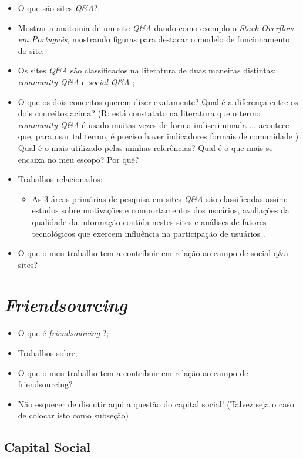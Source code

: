 

\begin{itemize}
  \item O que são sites \textit{Q\&A}?;
  \item Mostrar a anatomia de um site \textit{Q\&A} dando como exemplo o \textit{Stack Overflow em Português}, mostrando figuras para destacar o modelo de funcionamento do site;
  \item Os sites \textit{Q\&A} são classificados na literatura de duas maneiras distintas: \textit{community Q\&A} e \textit{social Q\&A} \cite{gazan2011social};
  \item O que os dois conceitos querem dizer exatamente? Qual é a diferença entre os dois conceitos acima? (R: está constatato na literatura que o termo \textit{community Q\&A} é usado muitas vezes de forma indiscriminada \cite{rosenbaum2010structuration}... acontece que, para usar tal termo, é preciso haver indicadores formais de comunidade \cite{kling2005understanding}) Qual é o mais utilizado pelas minhas referências? Qual é o que mais se encaixa no meu escopo? Por quê?
  \item Trabalhos relacionados:
    \begin{itemize}
        \item As 3 áreas primárias de pesquisa em sites \textit{Q\&A} são classificadas assim: estudos sobre motivações e comportamentos dos usuários, avaliações da qualidade da informação contida nestes sites e análises de fatores tecnológicos que exercem influência na participação de usuários \cite{shah2009research}.
    \end{itemize}
  \item O que o meu trabalho tem a contribuir em relação ao campo de social q\&a sites?
\end{itemize}
\section{\textit{Friendsourcing}}
\begin{itemize}
  \item O que é \textit{friendsourcing} \cite{Bernstein:2008:PVF:1746259.1746260}?;
  \item Trabalhos sobre;
  \item O que o meu trabalho tem a contribuir em relação ao campo de friendsourcing?
  \item Não esquecer de discutir aqui a questão do capital social! (Talvez seja o caso de colocar isto como subseção)
\end{itemize}
\subsection{Capital Social}